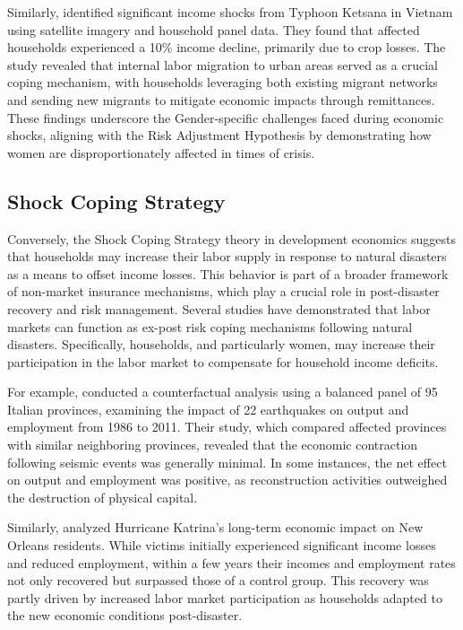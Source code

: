 \documentclass[a4paper,12pt]{article}
\begin{document}
Similarly, \citet{Groger2016InternalTyphoon} identified significant income shocks from Typhoon Ketsana in Vietnam using satellite imagery and household panel data. They found that affected households experienced a 10\% income decline, primarily due to crop losses. The study revealed that internal labor migration to urban areas served as a crucial coping mechanism, with households leveraging both existing migrant networks and sending new migrants to mitigate economic impacts through remittances. These findings underscore the Gender-specific challenges faced during economic shocks, aligning with the Risk Adjustment Hypothesis by demonstrating how women are disproportionately affected in times of crisis.

\subsection{Shock Coping Strategy}
\label{sec5.2}

Conversely, the Shock Coping Strategy theory in development economics suggests that households may increase their labor supply in response to natural disasters as a means to offset income losses. This behavior is part of a broader framework of non-market insurance mechanisms, which play a crucial role in post-disaster recovery and risk management. Several studies have demonstrated that labor markets can function as ex-post risk coping mechanisms following natural disasters. Specifically, households, and particularly women, may increase their participation in the labor market to compensate for household income deficits.

For example, \citet{Porcelli2019TheItaly} conducted a counterfactual analysis using a balanced panel of 95 Italian provinces, examining the impact of 22 earthquakes on output and employment from 1986 to 2011. Their study, which compared affected provinces with similar neighboring provinces, revealed that the economic contraction following seismic events was generally minimal. In some instances, the net effect on output and employment was positive, as reconstruction activities outweighed the destruction of physical capital.

Similarly, \citet{Deryugina2018TheReturns} analyzed Hurricane Katrina's long-term economic impact on New Orleans residents. While victims initially experienced significant income losses and reduced employment, within a few years their incomes and employment rates not only recovered but surpassed those of a control group. This recovery was partly driven by increased labor market participation as households adapted to the new economic conditions post-disaster.
\end{document}
